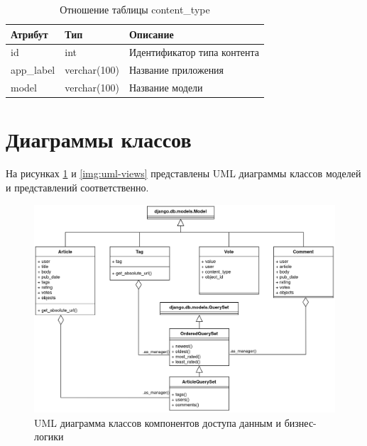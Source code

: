 \begin{table}[H]
	\centering
	\caption{Отношение таблицы content\_type}
	\label{tbl:django_content_type}
	\begin{tabular}{|l|l|l|}
		\hline
		\textbf{Атрибут} & \textbf{Тип} & \textbf{Описание}           \\ \hline
		id               & int          & Идентификатор типа контента \\ \hline
		app\_label       & verchar(100) & Название приложения         \\ \hline
		model            & verchar(100) & Название модели             \\ \hline
	\end{tabular}
\end{table}

\section{Диаграммы классов}

На рисунках \ref{img:uml-models} и \ref{img:uml-views} представлены UML диаграммы классов моделей и представлений соответственно.

\begin{figure}[H]
	\centering
	\includegraphics[width=\linewidth]{inc/img/uml-models}
	\caption{UML диаграмма классов компонентов доступа данным и бизнес-логики}
	\label{img:uml-models}
\end{figure}

